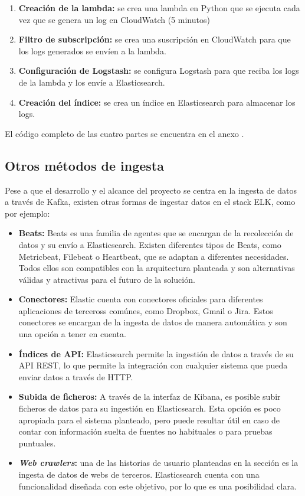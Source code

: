 \begin{enumerate}
	\item \textbf{Creación de la lambda:} se crea una lambda en Python que se
		ejecuta cada vez que se genera un log en CloudWatch (5 minutos)
	\item \textbf{Filtro de subscripción:} se crea una suscripción en CloudWatch
		para que los logs generados se envíen a la lambda.
	\item \textbf{Configuración de Logstash:} se configura Logstash para que
		reciba los logs de la lambda y los envíe a Elasticsearch.
	\item \textbf{Creación del índice:} se crea un índice en Elasticsearch para
		almacenar los logs.
\end{enumerate}

El código completo de las cuatro partes se encuentra en el anexo .


\newpage{}
\subsection{Otros métodos de ingesta}\label{subsec:impl_ingesta_otros}
Pese a que el desarrollo y el alcance del proyecto se centra en la ingesta de
datos a través de Kafka, existen otras formas de ingestar datos en el stack
ELK, como por ejemplo:

\begin{itemize}
	\item \textbf{Beats:} Beats es una familia de agentes que se encargan de
		la recolección de datos y su envío a Elasticsearch. Existen diferentes
		tipos de Beats, como Metricbeat, Filebeat o Heartbeat, que se adaptan a
		diferentes necesidades. Todos ellos son compatibles con la arquitectura
		planteada y son alternativas válidas y atractivas para el futuro de la
		solución.
	\item \textbf{Conectores:} Elastic cuenta con conectores oficiales para
		diferentes aplicaciones de terceross comúnes, como Dropbox, Gmail o
		Jira. Estos conectores se encargan de la ingesta de datos de manera
		automática y son una opción a tener en cuenta.
	\item \textbf{Índices de API:} Elasticsearch permite la ingestión de datos
		a través de su API REST, lo que permite la integración con cualquier
		sistema que pueda enviar datos a través de HTTP.
	\item \textbf{Subida de ficheros:} A través de la interfaz de Kibana, es
		posible subir ficheros de datos para su ingestión en Elasticsearch. Esta
		opción es poco apropiada para el sistema planteado, pero puede resultar
		útil en caso de contar con información suelta de fuentes no habituales o
		para pruebas puntuales.
	\item \textbf{\textit{Web crawlers}:} una de las historias de usuario
		planteadas en la sección  es la ingesta de
		datos de webs de terceros. Elasticsearch cuenta con una funcionalidad
		diseñada con este objetivo, por lo que es una posibilidad clara.
\end{itemize}
